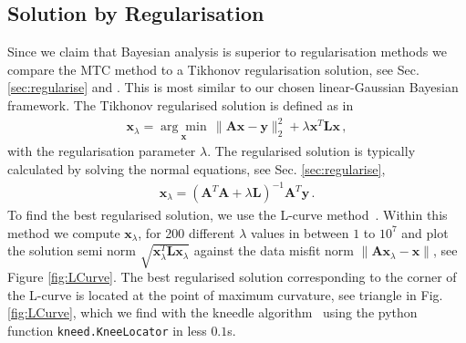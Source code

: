 \subsection{Solution by Regularisation}
\label{sec:reg}
Since we claim that Bayesian analysis is superior to regularisation methods we compare the MTC method to a Tikhonov regularisation solution, see Sec. \ref{sec:regularise} and \cite{fox2016fast}.
This is most similar to our chosen linear-Gaussian Bayesian framework.
The Tikhonov regularised solution is defined as in~\cite{hansen2010discrete, fox2016fast} 
\begin{align}
	\bm{x}_{\lambda} =\underset{ \bm{x}}{\arg \min}\,  \lVert \bm{A}\bm{x} - \bm{y} \rVert_2^2 + \lambda \bm{x}^T \bm{L} \bm{x} \, ,
	\label{eq:XLam}
\end{align}
with the regularisation parameter $\lambda$.
The regularised solution is typically calculated by solving the normal equations, see Sec. \ref{sec:regularise},
\begin{align}
	\bm{x}_{\lambda} = (\bm{A}^T\bm{A} + \lambda \bm{L} )^{-1} \bm{A}^T \bm{y} \label{eq:xLam} \, .
\end{align}
To find the best regularised solution, we use the L-curve method~\cite{hansen1993use}.
Within this method we compute $\bm{x}_\lambda$, for 200 different $\lambda$ values in between $1$ to $10^7$ and plot the solution semi norm $\sqrt{\bm{x}_\lambda^T\mathbf{L} \bm{x}_\lambda}$ against the data misfit norm $\lVert \bm{A}\bm{x}_\lambda - \bm{x} \rVert$, see Figure \ref{fig:LCurve}. 
The best regularised solution corresponding to the corner of the L-curve is located at the point of maximum curvature, see triangle in Fig. \ref{fig:LCurve}, which we find with the kneedle algorithm~\cite{satopaa2011kneedle} using the python function \texttt{kneed.KneeLocator} in less $0.1$s.
